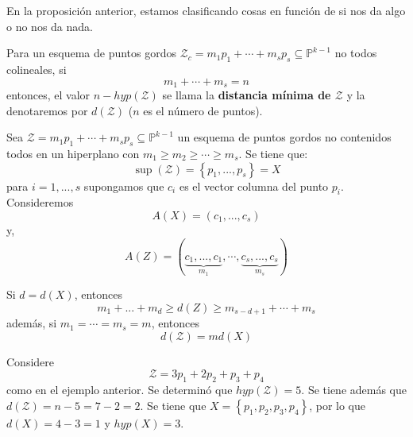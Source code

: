 \documentclass[12pt]{report}
\theoremstyle{largebreak}
\begin{document}
    \begin{obs}
        En la proposición anterior, estamos clasificando cosas en función de si nos da algo o no nos da nada.
    \end{obs}

    \begin{mydef}
        Para un esquema de puntos gordos $\mathcal{Z}_c=m_1p_1+\cdots+m_sp_s\subseteq\mathbb{P}^{k-1}$ no todos colineales, si
        \begin{equation*}
            m_1+\cdots+m_s=n
        \end{equation*}
        entonces, el valor $n-hyp(\mathcal{Z})$ se llama la \textbf{distancia mínima de $\mathcal{Z}$} y la denotaremos por $d(\mathcal{Z})$ ($n$ es el número de puntos).
    \end{mydef}

    Sea $\mathcal{Z}=m_1p_1+\cdots+m_sp_s\subseteq\mathbb{P}^{ k-1}$ un esquema de puntos gordos no contenidos todos en un hiperplano con $m_1\geq m_2\geq\cdots\geq m_s$. Se tiene que:
    \begin{equation*}
        \sup(\mathcal{Z})=\left\{p_1,...,p_s \right\}=X
    \end{equation*}
    para $i=1,...,s$ supongamos que $c_i$ es el vector columna del punto $p_i$. Consideremos
    \begin{equation*}
        A(X)=(c_1,...,c_s)
    \end{equation*}
    y,
    \begin{equation*}
        A(Z)=(\underset{ m_1}{\underbrace{ c_1,...,c_1}},\cdots,\underset{ m_s}{\underbrace{ c_s,...,c_s}})
    \end{equation*}

    \begin{theor}
        Si $d=d(X)$, entonces
        \begin{equation*}
            m_1+...+m_d\geq d(Z)\geq m_{ s-d+1}+\cdots+m_s
        \end{equation*}
        además, si $m_1=\cdots=m_s=m$, entonces
        \begin{equation*}
            d(\mathcal{Z})=md(X)
        \end{equation*}
    \end{theor}

    \begin{exa}
        Considere
        \begin{equation*}
            \mathcal{Z}=3p_1+2p_2+p_3+p_4
        \end{equation*}
        como en el ejemplo anterior. Se determinó que $hyp(\mathcal{Z})=5$. Se tiene además que $d(\mathcal{Z})=n-5=7-2=2$. Se tiene que $X=\left\{p_1,p_2,p_3,p_4\right\}$, por lo que $d(X)=4-3=1$ y $hyp(X)=3$.
    \end{exa}
\end{document}
